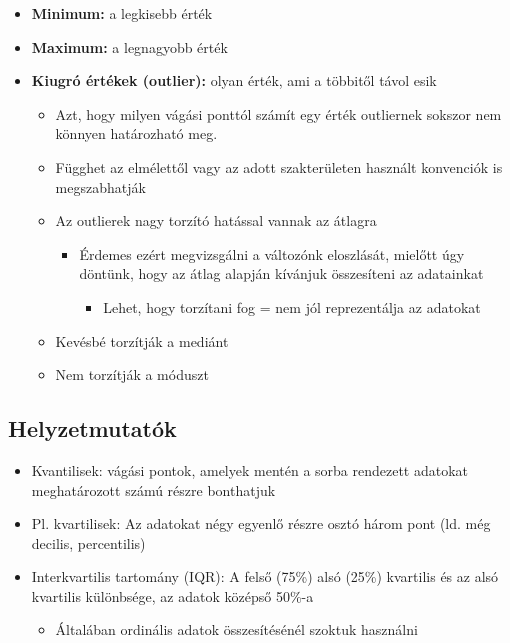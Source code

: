 \documentclass[
  letterpaper,
  DIV=11,
  numbers=noendperiod]{scrreprt}
\providecommand{\tightlist}{%
  \setlength{\itemsep}{0pt}\setlength{\parskip}{0pt}}\usepackage{longtable,booktabs,array}
\begin{document}
\begin{itemize}
\item
  \textbf{Minimum:} a legkisebb érték
\item
  \textbf{Maximum:} a legnagyobb érték
\item
  \textbf{Kiugró értékek (outlier):} olyan érték, ami a többitől távol
  esik

  \begin{itemize}
  \item
    Azt, hogy milyen vágási ponttól számít egy érték outliernek sokszor
    nem könnyen határozható meg.
  \item
    Függhet az elmélettől vagy az adott szakterületen használt
    konvenciók is megszabhatják
  \item
    Az outlierek nagy torzító hatással vannak az átlagra

    \begin{itemize}
    \item
      Érdemes ezért megvizsgálni a változónk eloszlását, mielőtt úgy
      döntünk, hogy az átlag alapján kívánjuk összesíteni az adatainkat

      \begin{itemize}
      \tightlist
      \item
        Lehet, hogy torzítani fog = nem jól reprezentálja az adatokat
      \end{itemize}
    \end{itemize}
  \item
    Kevésbé torzítják a mediánt
  \item
    Nem torzítják a móduszt
  \end{itemize}
\end{itemize}

\hypertarget{helyzetmutatuxf3k}{%
\subsection{Helyzetmutatók}\label{helyzetmutatuxf3k}}

\begin{itemize}
\item
  Kvantilisek: vágási pontok, amelyek mentén a sorba rendezett adatokat
  meghatározott számú részre bonthatjuk
\item
  Pl. kvartilisek: Az adatokat négy egyenlő részre osztó három pont (ld.
  még decilis, percentilis)
\item
  Interkvartilis tartomány (IQR): A felső (75\%) alsó (25\%) kvartilis
  és az alsó kvartilis különbsége, az adatok középső 50\%-a~

  \begin{itemize}
  \tightlist
  \item
    Általában ordinális adatok összesítésénél szoktuk használni
  \end{itemize}
\end{itemize}
\end{document}
